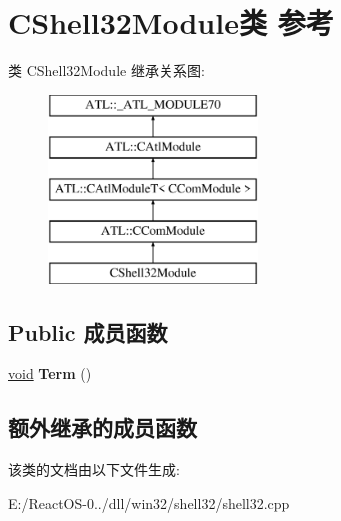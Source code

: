 \hypertarget{class_c_shell32_module}{}\section{C\+Shell32\+Module类 参考}
\label{class_c_shell32_module}
类 C\+Shell32\+Module 继承关系图\+:\begin{figure}[H]
\begin{center}
\leavevmode
\includegraphics[height=5.000000cm]{class_c_shell32_module}
\end{center}
\end{figure}
\subsection*{Public 成员函数}
\begin{DoxyCompactItemize}
\item 
\mbox{\label{class_c_shell32_module_a71bce46be660cff3893747fab629e530}} 
\hyperlink{interfacevoid}{void} {\bfseries Term} ()
\end{DoxyCompactItemize}
\subsection*{额外继承的成员函数}


该类的文档由以下文件生成\+:\begin{DoxyCompactItemize}
\item 
E\+:/\+React\+O\+S-\/0../dll/win32/shell32/shell32.\+cpp\end{DoxyCompactItemize}
